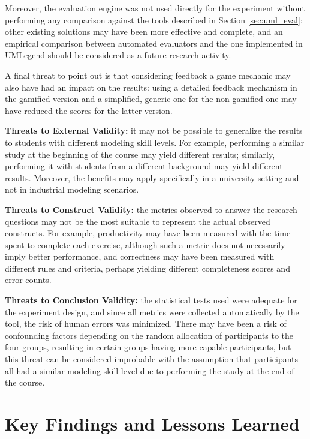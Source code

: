 Moreover, the evaluation engine was not used directly for the experiment without performing any comparison against the tools described in Section \ref{sec:uml_eval}; other existing solutions may have been more effective and complete, and an empirical comparison between automated evaluators and the one implemented in UMLegend should be considered as a future research activity.

A final threat to point out is that considering feedback a game mechanic may also have had an impact on the results: using a detailed feedback mechanism in the gamified version and a simplified, generic one for the non-gamified one may have reduced the scores for the latter version.

\textbf{Threats to External Validity:} it may not be possible to generalize the results to students with different modeling skill levels. For example, performing a similar study at the beginning of the course may yield different results; similarly, performing it with students from a different background may yield different results. Moreover, the benefits may apply specifically in a university setting and not in industrial modeling scenarios.

\textbf{Threats to Construct Validity:} the metrics observed to answer the research questions may not be the most suitable to represent the actual observed constructs. For example, productivity may have been measured with the time spent to complete each exercise, although such a metric does not necessarily imply better performance, and correctness may have been measured with different rules and criteria, perhaps yielding different completeness scores and error counts.

\textbf{Threats to Conclusion Validity:} the statistical tests used were adequate for the experiment design, and since all metrics were collected automatically by the tool, the risk of human errors was minimized. There may have been a risk of confounding factors depending on the random allocation of participants to the four groups, resulting in certain groups having more capable participants, but this threat can be considered improbable with the assumption that participants all had a similar modeling skill level due to performing the study at the end of the course.

\section{Key Findings and Lessons Learned}

